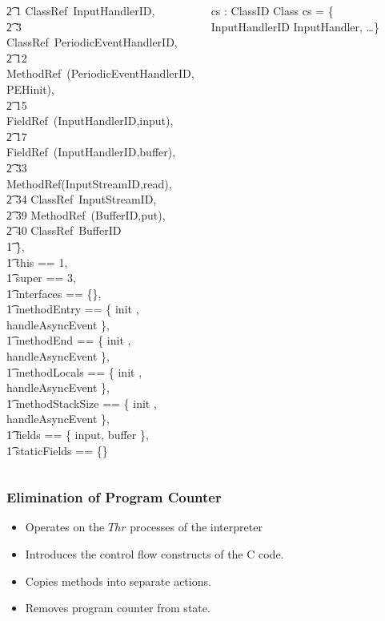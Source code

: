 \documentclass{beamer}
\begin{document}
\begin{frame}
\begin{columns}[c]
\begin{axdef}
      \t2 1 \mapsto ClassRef~InputHandlerID, \\
      \t2 3 \mapsto ClassRef~PeriodicEventHandlerID, \\
      \t2 12 \mapsto MethodRef~(PeriodicEventHandlerID, PEHinit), \\
      \t2 15 \mapsto FieldRef~(InputHandlerID,input), \\
      \t2 17 \mapsto FieldRef~(InputHandlerID,buffer), \\
      \t2 33 \mapsto MethodRef(InputStreamID,read), \\
      \t2 34 \mapsto ClassRef~InputStreamID, \\
      \t2 39 \mapsto MethodRef~(BufferID,put), \\
      \t2 40 \mapsto ClassRef~BufferID \\
      \t1 \}, \\
      \t1 this == 1, \\
      \t1 super == 3, \\
      \t1 interfaces == \{\}, \\
      \t1 methodEntry == \{ init , handleAsyncEvent  \}, \\
      \t1 methodEnd == \{ init , handleAsyncEvent  \}, \\
      \t1 methodLocals == \{ init , handleAsyncEvent  \}, \\
      \t1 methodStackSize == \{ init , handleAsyncEvent  \}, \\
      \t1 fields == \{ input, buffer \}, \\
      \t1 staticFields == \{\} \\
      \rblot
    \end{axdef}
    \vspace{-0.5cm}
    \begin{axdef}
      cs : ClassID \pfun Class
    \where
      cs = \{ InputHandlerID \mapsto InputHandler, \dots \}
    \end{axdef}
  \end{columns}
\end{frame}

\begin{frame}
  \frametitle{Elimination of Program Counter}
  \begin{itemize}
  \item Operates on the $Thr$ processes of the interpreter
  \item Introduces the control flow constructs of the C code.
  \item Copies methods into separate actions.
  \item Removes program counter from state.
  \end{itemize}
\end{frame}
\end{document}
